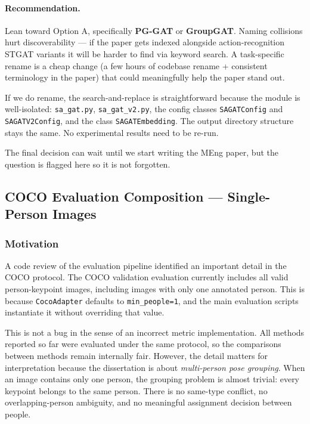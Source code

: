 \paragraph{Recommendation.} Lean toward Option A, specifically \textbf{PG-GAT} or \textbf{GroupGAT}. Naming collisions hurt discoverability --- if the paper gets indexed alongside action-recognition STGAT variants it will be harder to find via keyword search. A task-specific rename is a cheap change (a few hours of codebase rename + consistent terminology in the paper) that could meaningfully help the paper stand out.

If we do rename, the search-and-replace is straightforward because the module is well-isolated: \texttt{sa\_gat.py}, \texttt{sa\_gat\_v2.py}, the config classes \texttt{SAGATConfig} and \texttt{SAGATV2Config}, and the class \texttt{SAGATEmbedding}. The output directory structure stays the same. No experimental results need to be re-run.

The final decision can wait until we start writing the MEng paper, but the question is flagged here so it is not forgotten.


\subsection{COCO Evaluation Composition --- Single-Person Images}

\subsubsection{Motivation}

A code review of the evaluation pipeline identified an important detail in the COCO protocol.
The COCO validation evaluation currently includes all valid person-keypoint images, including images with only one annotated person.
This is because \texttt{CocoAdapter} defaults to \texttt{min\_people=1}, and the main evaluation scripts instantiate it without overriding that value.

This is not a bug in the sense of an incorrect metric implementation.
All methods reported so far were evaluated under the same protocol, so the comparisons between methods remain internally fair.
However, the detail matters for interpretation because the dissertation is about \emph{multi-person pose grouping}.
When an image contains only one person, the grouping problem is almost trivial: every keypoint belongs to the same person.
There is no same-type conflict, no overlapping-person ambiguity, and no meaningful assignment decision between people.

